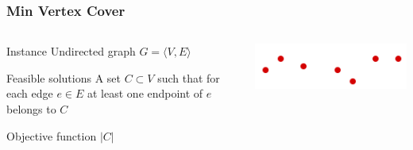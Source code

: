 \documentclass[12pt,aspectratio=169]{beamer}
\begin{document}
\begin{frame}\frametitle{Min Vertex Cover }
\begin{columns} 
  \begin{column}{0.48\textwidth}
  \begin{block}{Instance}
    Undirected graph $G=\langle V,E \rangle$
  \end{block}
  \begin{block}{Feasible solutions}
    A set $C\subset V$ such that for each edge $e\in E$ at least one endpoint of $e$
    belongs to $C$
  \end{block}
  \begin{block}{Objective function}
    $|C|$
  \end{block}
\end{column}
    
    \begin{column}{0.48\textwidth}
      \centering

  \includegraphics[height=0.2\textheight]{img/Vertex-cover}
\end{column}
\end{columns}
\end{frame}
\end{document}
